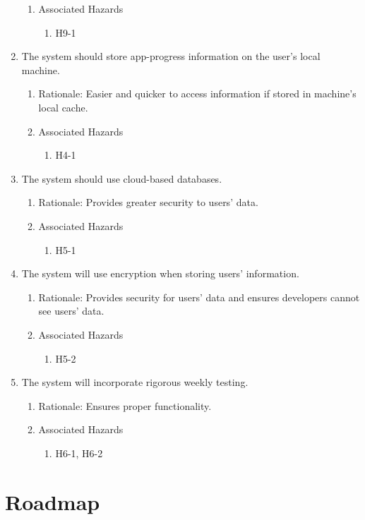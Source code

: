 \documentclass{article}
\begin{document}
\begin{enumerate}
\begin{enumerate}
        \item Associated Hazards
        \begin{enumerate}
            \item H9-1
        \end{enumerate}
    \end{enumerate}
    \item The system should store app-progress information on the user’s local machine.
    \begin{enumerate}
        \item Rationale: Easier and quicker to access information if stored in machine’s local cache.
        \item Associated Hazards
        \begin{enumerate}
            \item H4-1
        \end{enumerate}
    \end{enumerate}
    \item The system should use cloud-based databases.
    \begin{enumerate}
        \item Rationale: Provides greater security to users’ data.
        \item Associated Hazards
        \begin{enumerate}
            \item H5-1
        \end{enumerate}
    \end{enumerate}
     \item The system will use encryption when storing users’ information.
    \begin{enumerate}
        \item Rationale: Provides security for users’ data and ensures developers cannot see users’ data.
        \item Associated Hazards
        \begin{enumerate}
            \item H5-2
        \end{enumerate}
    \end{enumerate} 
     \item The system will incorporate rigorous weekly testing.
    \begin{enumerate}
        \item Rationale: Ensures proper functionality.
        \item Associated Hazards
        \begin{enumerate}
            \item H6-1, H6-2
        \end{enumerate}
    \end{enumerate} 
\end{enumerate}
\section{Roadmap}

\end{document}
